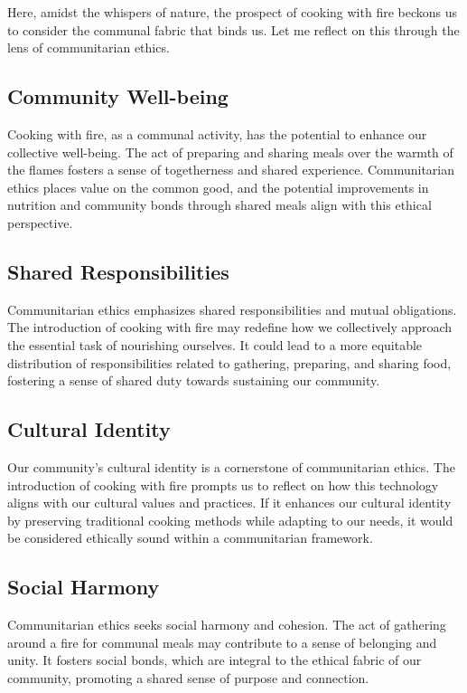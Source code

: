 Here, amidst the whispers of nature, the prospect of cooking with fire beckons us to consider the communal fabric that binds us. Let me reflect on this through the lens of communitarian ethics.

\subsection{Community Well-being}
Cooking with fire, as a communal activity, has the potential to enhance our collective well-being. The act of preparing and sharing meals over the warmth of the flames fosters a sense of togetherness and shared experience. Communitarian ethics places value on the common good, and the potential improvements in nutrition and community bonds through shared meals align with this ethical perspective.

\subsection{Shared Responsibilities}
Communitarian ethics emphasizes shared responsibilities and mutual obligations. The introduction of cooking with fire may redefine how we collectively approach the essential task of nourishing ourselves. It could lead to a more equitable distribution of responsibilities related to gathering, preparing, and sharing food, fostering a sense of shared duty towards sustaining our community.

\subsection{Cultural Identity}
Our community's cultural identity is a cornerstone of communitarian ethics. The introduction of cooking with fire prompts us to reflect on how this technology aligns with our cultural values and practices. If it enhances our cultural identity by preserving traditional cooking methods while adapting to our needs, it would be considered ethically sound within a communitarian framework.

\subsection{Social Harmony}
Communitarian ethics seeks social harmony and cohesion. The act of gathering around a fire for communal meals may contribute to a sense of belonging and unity. It fosters social bonds, which are integral to the ethical fabric of our community, promoting a shared sense of purpose and connection.

